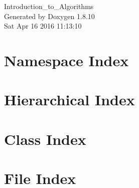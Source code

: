 \documentclass[twoside]{book}
\newcommand{\+}{\discretionary{\mbox{\scriptsize$\hookleftarrow$}}{}{}}
\newcommand{\clearemptydoublepage}{%
  \newpage{\pagestyle{empty}\cleardoublepage}%
}
\begin{document}
\hypersetup{pageanchor=false,
             bookmarks=true,
             bookmarksnumbered=true,
             pdfencoding=unicode
            }
\begin{titlepage}
\vspace*{7cm}
\begin{center}%
{\Large Introduction\+\_\+to\+\_\+\+Algorithms }\\
\vspace*{1cm}
{\large Generated by Doxygen 1.8.10}\\
\vspace*{0.5cm}
{\small Sat Apr 16 2016 11:13:10}\\
\end{center}
\end{titlepage}
\clearemptydoublepage
\tableofcontents
\clearemptydoublepage
{}
\hypersetup{pageanchor=true}

\chapter{Namespace Index}

\chapter{Hierarchical Index}

\chapter{Class Index}

\chapter{File Index}

\end{document}
